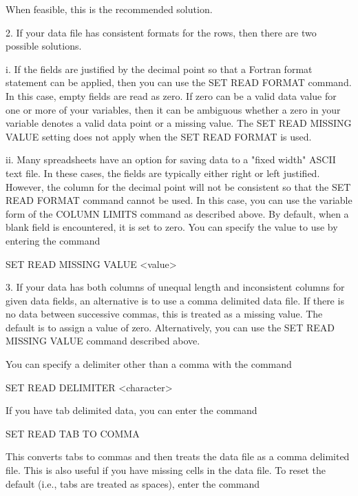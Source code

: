        When feasible, this is the recommended solution.

    2. If your data file has consistent formats for the rows,
       then there are two possible solutions.

         i. If the fields are justified by the decimal point so that a
            Fortran format statement can be applied, then you can use the
            SET READ FORMAT command.  In this case, empty fields are read
            as zero.  If zero can be a valid data value for one or more of
            your variables, then it can be ambiguous whether a zero in your
            variable denotes a valid data point or a missing value.  The
            SET READ MISSING VALUE setting does not apply when the
            SET READ FORMAT is used.

        ii. Many spreadsheets have an option for saving data to a "fixed
            width" ASCII text file.  In these cases, the fields are
            typically either right or left justified.  However, the column
            for the decimal point will not be consistent so that the
            SET READ FORMAT command cannot be used.  In this case, you can
            use the variable form of the COLUMN LIMITS command as
            described above.  By default, when a blank field is
            encountered, it is set to zero.  You can specify the
            value to use by entering the command

              SET READ MISSING VALUE  <value>

    3. If your data has both columns of unequal length and
       inconsistent columns for given data fields, an alternative
       is to use a comma delimited data file.  If there is no data
       between successive commas, this is treated as a missing value.
       The default is to assign a value of zero.  Alternatively, you
       can use the SET READ MISSING VALUE command described above.

       You can specify a delimiter other than a comma with the
       command

          SET READ DELIMITER <character>

       If you have tab delimited data, you can enter the command

          SET READ TAB TO COMMA

       This converts tabs to commas and then treats the data file as a
       comma delimited file.  This is also useful if you have missing
       cells in the data file.  To reset the default (i.e., tabs are
       treated as spaces), enter the command

